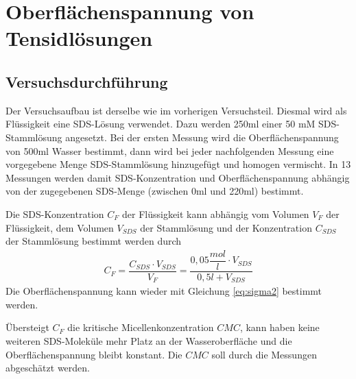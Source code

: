 \documentclass{scrartcl}
\begin{document}
\section{Oberflächenspannung von Tensidlösungen}
\subsection{Versuchsdurchführung}
Der Versuchsaufbau ist derselbe wie im vorherigen Versuchsteil. Diesmal wird als Flüssigkeit eine SDS-Lösung verwendet. Dazu werden 250ml einer 50 mM SDS-Stammlösung angesetzt.
Bei der ersten Messung wird die Oberflächenspannung von 500ml Wasser bestimmt, dann wird bei jeder nachfolgenden Messung eine vorgegebene Menge SDS-Stammlösung hinzugefügt und homogen vermischt.
In 13 Messungen werden damit SDS-Konzentration und Oberflächenspannung abhängig von der zugegebenen SDS-Menge (zwischen 0ml und 220ml) bestimmt.

Die SDS-Konzentration $C_{F}$ der Flüssigkeit kann abhängig vom Volumen $V_{F}$ der Flüssigkeit, dem Volumen $V_{SDS}$ der Stammlösung und der Konzentration $C_{SDS}$ der Stammlösung bestimmt werden durch
\begin{align}
C_{F} = \dfrac{C_{SDS} \cdot V_{SDS}}{V_{F}} = \dfrac{0,05 \dfrac{mol}{l} \cdot V_{SDS}}{0,5l + V_{SDS}}
\end{align}
Die Oberflächenspannung kann wieder mit Gleichung \ref{eq:sigma2} bestimmt werden.

Übersteigt $C_{F}$ die kritische Micellenkonzentration $CMC$, kann haben keine weiteren SDS-Moleküle mehr Platz an der Wasseroberfläche und die Oberflächenspannung bleibt konstant. Die $CMC$ soll durch die Messungen abgeschätzt werden.
\end{document}
